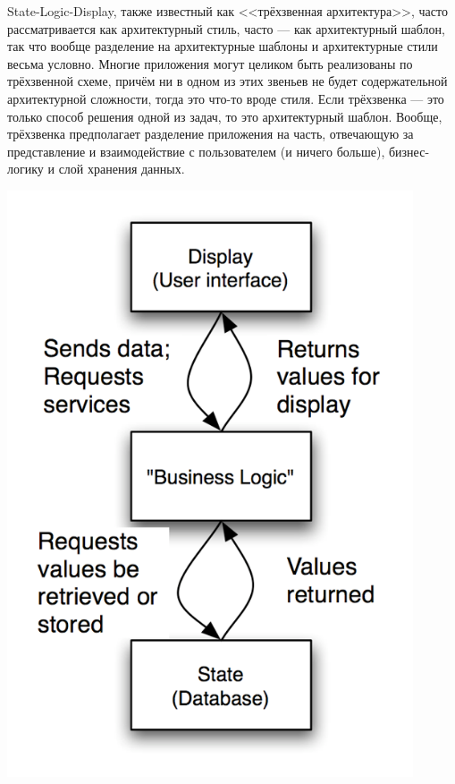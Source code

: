 \documentclass[a5paper]{article}
\newlength\Colsep
\begin{document}
\noindent\begin{minipage}{\textwidth}
    \begin{minipage}[c][6cm][c]{\dimexpr0.7\textwidth-0.5\Colsep\relax}
        State-Logic-Display, также известный как <<трёхзвенная архитектура>>, часто рассматривается как архитектурный стиль, часто --- как архитектурный шаблон, так что вообще разделение на архитектурные шаблоны и архитектурные стили весьма условно. Многие приложения могут целиком быть реализованы по трёхзвенной схеме, причём ни в одном из этих звеньев не будет содержательной архитектурной сложности, тогда это что-то вроде стиля. Если трёхзвенка --- это только способ решения одной из задач, то это архитектурный шаблон. Вообще, трёхзвенка предполагает разделение приложения на часть, отвечающую за представление и взаимодействие с пользователем (и ничего больше), бизнес-логику и слой хранения данных.
    \end{minipage}\hfill
    \begin{minipage}[c][6cm][c]{\dimexpr0.3\textwidth-0.5\Colsep\relax}
        \includegraphics[width=0.9\textwidth]{threeTieredArchitecture.png}
    \end{minipage}%
\end{minipage}
\end{document}
